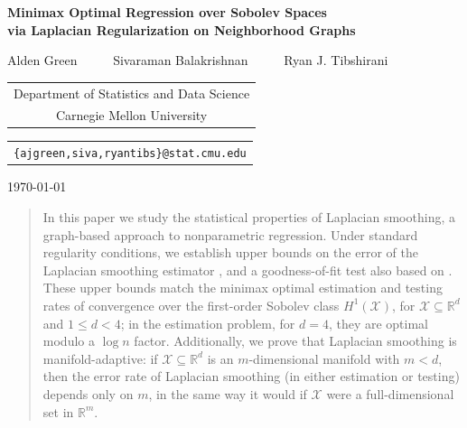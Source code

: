 \documentclass[twoside]{article}
\newcommand{\Reals}{\mathbb{R}}
\newcommand{\1}{\mathbf{1}}
\newcommand{\Rd}{\Reals^d}
\newcommand{\Xset}{\mathcal{X}}
\newcommand{\wh}[1]{\widehat{#1}}
\theoremstyle{definition}
\theoremstyle{remark}
\begin{document}
\begin{center} {\Large{\bf{Minimax Optimal Regression over Sobolev Spaces \\
\vspace{.2cm}
 via Laplacian Regularization on Neighborhood Graphs}}}
	
	\vspace*{.3cm}
	
	{\large{
			\begin{center}
				Alden Green~~~~~ Sivaraman Balakrishnan~~~~~ Ryan J. Tibshirani\\
				\vspace{.2cm}
			\end{center}
			
			
			\begin{tabular}{c}
				Department of Statistics and Data Science \\
				Carnegie Mellon University
			\end{tabular}
			
			\vspace*{.2in}
			
			\begin{tabular}{c}
				\texttt{\{ajgreen,siva,ryantibs\}@stat.cmu.edu}
			\end{tabular}
	}}
	
	\vspace*{.2in}
	
	\today
	\vspace*{.2in}

\end{center}


\begin{abstract}
	In this paper we study the statistical properties of Laplacian smoothing, a graph-based approach to nonparametric regression. Under standard regularity conditions, we establish upper bounds on the error of the Laplacian smoothing estimator \smash{$\wh{f}$}, and a goodness-of-fit test also based on \smash{$\wh{f}$}. These upper bounds match the minimax optimal estimation and testing rates of convergence over the first-order Sobolev class $H^1(\Xset)$, for $\Xset \subseteq \Rd$ and $1 \leq d < 4$; in the estimation problem, for $d = 4$, they are optimal modulo a $\log n$ factor. Additionally, we prove that Laplacian smoothing is manifold-adaptive: if $\Xset \subseteq \Reals^d$ is an $m$-dimensional manifold with $m < d$, then the error rate of Laplacian smoothing (in either estimation or testing) depends only on $m$, in the same way it would if $\Xset$ were a full-dimensional set in $\Reals^m$.
\end{abstract}
\end{document}
